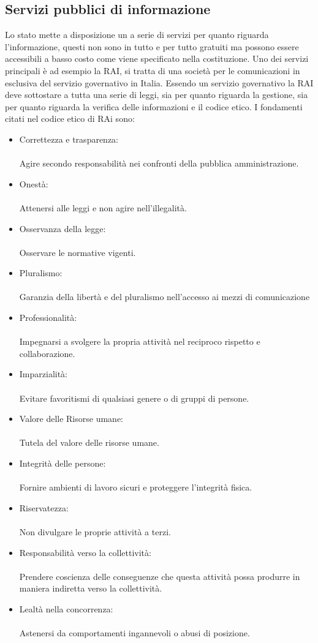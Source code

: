 \documentclass{article}
\begin{document}
\subsection{Servizi pubblici di informazione}
Lo stato mette a disposizione un
a serie di servizi per quanto riguarda l'informazione, questi non sono in tutto e per tutto gratuiti ma possono essere accessibili a basso costo come viene specificato nella costituzione.
Uno dei servizi principali è ad esempio la RAI, si tratta di una società per le comunicazioni in esclusiva del servizio governativo in Italia.
Essendo un servizio governativo la RAI deve sottostare a tutta una serie di leggi, sia per quanto riguarda la gestione, sia per quanto riguarda la verifica delle informazioni e il codice etico.
I fondamenti citati nel codice etico di RAi sono:
\begin{itemize}
 \item Correttezza e trasparenza:\\
 \\
 Agire secondo responsabilità nei confronti della pubblica amministrazione.
 \item Onestà: \\
 \\
  Attenersi alle leggi e non agire nell'illegalità.
 \item Osservanza della legge: \\
 \\
 Osservare le  normative vigenti.
 \item Pluralismo: \\
 \\
 Garanzia della libertà e del pluralismo nell’accesso ai mezzi di comunicazione
 \item Professionalità: \\
 \\
 Impegnarsi a svolgere la propria attività nel reciproco rispetto e collaborazione.
 \item Imparzialità: \\
 \\
 Evitare favoritismi di qualsiasi genere o di gruppi di persone.
 \item Valore delle Risorse umane: \\
 \\
 Tutela del valore delle risorse umane.
 \item Integrità delle persone: \\
 \\
 Fornire ambienti di lavoro sicuri e proteggere l'integrità fisica.
 \item Riservatezza: \\
 \\
 Non divulgare le proprie attività a terzi.
 \item Responsabilità verso la collettività: \\
 \\
 Prendere coscienza delle conseguenze che questa attività possa produrre in maniera indiretta verso la collettività.
 \item Lealtà nella concorrenza: \\
 \\
 Astenersi da comportamenti ingannevoli o abusi di posizione.
\end{itemize}
\end{document}
